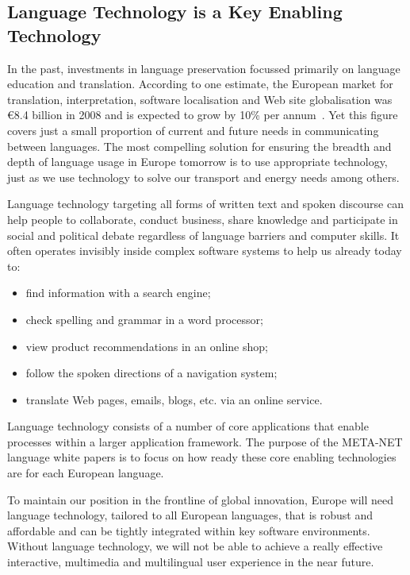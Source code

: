 \begin{multicols}{2}
\subsection{Language Technology is a Key Enabling Technology}

In the past, investments in language preservation focussed primarily on language education and translation. According to one estimate, the European market for translation, interpretation, software localisation and Web site globalisation was €8.4 billion in 2008 and is expected to grow by 10\% per annum~\cite{EC3}. Yet this figure covers just a small proportion of current and future needs in communicating between languages. The most compelling solution for ensuring the breadth and depth of language usage in Europe tomorrow is to use appropriate technology, just as we use technology to solve our transport and energy needs among others.

Language technology targeting all forms of written text and spoken discourse can help people to collaborate, conduct business, share knowledge and participate in social and political debate regardless of language barriers and computer skills. It often operates invisibly inside complex software systems to help us already today to:

\begin{itemize}
\item find information with a search engine;
\item check spelling and grammar in a word processor;
\item view product recommendations in an online shop;
\item follow the spoken directions of a navigation system;
\item translate Web pages, emails, blogs, etc. via an online service.
\end{itemize}

Language technology consists of a number of core applications that enable processes within a larger application framework. The purpose of the META-NET language white papers is to focus on how ready these core enabling technologies are for each European language. 


To maintain our position in the frontline of global innovation, Europe will need language technology, tailored to all European languages, that is robust and affordable and can be tightly integrated within key software environments. Without language technology, we will not be able to achieve a really effective interactive, multimedia and multilingual user experience in the near future.


\end{multicols}
